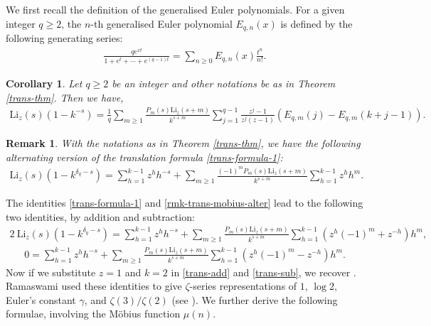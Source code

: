 \documentclass[12pt]{amsart}
\newtheorem{cor}{Corollary}
\newtheorem{rmk}{Remark}
\begin{document}
We first recall the definition of the generalised Euler polynomials. For a given integer $q\geq2$, the $n$-th generalised
Euler polynomial $E_{q,n}(x)$  is defined by the following generating series:
\begin{align}\label{Euler-poly}
\frac{qe^{xt}}{1+e^t+\cdots+e^{(q-1)t}}=\sum_{n\ge 0}E_{q,n}(x)\frac{t^n}{n!}.
\end{align}
 
 \begin{cor}\label{cor-Apostol-type-trans-1}
Let $q\geq2$ be an integer and other notations be as in Theorem \ref{trans-thm}. Then we have,
\begin{align}\label{Apostol-type-trans-1}
\mathrm{Li}_z(s)(1-k^{-s})=\frac{1}{q}\sum_{m\geq1}\frac{P_m(s)\mathrm{Li}_z(s+m)}{k^{s+m}}\sum_{j=1}^{q-1}\frac{z^{j}-1}{z^j(z-1)}\left(E_{q,m}(j)-E_{q,m}(k+j-1)\right).
\end{align}
\end{cor}

\begin{rmk}\label{rmk-trans-mobius}\rm
With the notations as in Theorem \ref{trans-thm}, we have the following alternating version of the translation formula \eqref{trans-formula-1}:
\begin{align}\label{rmk-trans-mobius-alter}
\mathrm{Li}_z(s)(1-k^{\delta_q-s})=\sum_{h=1}^{k-1}z^hh^{-s}
+\sum_{m\geq1}\frac{(-1)^mP_m(s)\mathrm{Li}_z(s+m)}{k^{s+m}}\sum_{h=1}^{k-1}z^{h}h^m.
\end{align}
\end{rmk}

The identities \eqref{trans-formula-1} and \eqref{rmk-trans-mobius-alter} lead to the following two identities, by addition and subtraction:
\begin{align}\label{trans-add}
 2\ \mathrm{Li}_z(s)(1-k^{\delta_q-s})=\sum_{h=1}^{k-1}z^hh^{-s}
 +\sum_{m\geq1}\frac{P_m(s)\mathrm{Li}_z(s+m)}{k^{s+m}}\sum_{h=1}^{k-1}\left(z^{h}(-1)^m+z^{-h}\right)h^m,
\end{align}
\begin{align}\label{trans-sub}
 0=\sum_{h=1}^{k-1} z^hh^{-s}
 +\sum_{m\geq1}\frac{P_m(s)\mathrm{Li}_z(s+m)}{k^{s+m}}\sum_{h=1}^{k-1}\left(z^{h}(-1)^m-z^{-h}\right)h^m.
\end{align}
Now if we substitute $z=1$ and $k=2$ in \eqref{trans-add} and \eqref{trans-sub},
we recover \cite[eq. (1) and (2)]{VR}. Ramaswami used these identities to give $\zeta$-series representations of
$1$, $\log 2$, Euler's constant $\gamma$, and $\zeta(3)/\zeta(2)$ (see \cite[\S 3, \S 5]{VR}).
We further derive the following formulae, involving the Möbius function $\mu(n)$.
\end{document}
